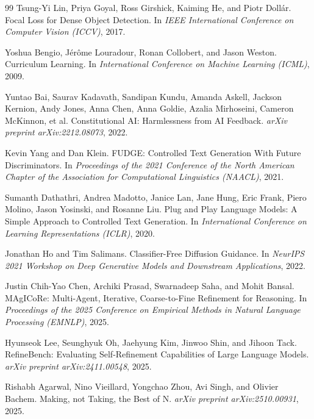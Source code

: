 \documentclass[11pt]{article}
\begin{document}
\begin{thebibliography}{99}
Tsung-Yi Lin, Priya Goyal, Ross Girshick, Kaiming He, and Piotr Doll\'{a}r.
\newblock Focal Loss for Dense Object Detection.
\newblock In \emph{IEEE International Conference on Computer Vision (ICCV)}, 2017.

Yoshua Bengio, J\'{e}r\^{o}me Louradour, Ronan Collobert, and Jason Weston.
\newblock Curriculum Learning.
\newblock In \emph{International Conference on Machine Learning (ICML)}, 2009.

Yuntao Bai, Saurav Kadavath, Sandipan Kundu, Amanda Askell, Jackson Kernion, Andy Jones, Anna Chen, Anna Goldie, Azalia Mirhoseini, Cameron McKinnon, et al.
\newblock Constitutional AI: Harmlessness from AI Feedback.
\newblock \emph{arXiv preprint arXiv:2212.08073}, 2022.

Kevin Yang and Dan Klein.
\newblock FUDGE: Controlled Text Generation With Future Discriminators.
\newblock In \emph{Proceedings of the 2021 Conference of the North American Chapter of the Association for Computational Linguistics (NAACL)}, 2021.

Sumanth Dathathri, Andrea Madotto, Janice Lan, Jane Hung, Eric Frank, Piero Molino, Jason Yosinski, and Rosanne Liu.
\newblock Plug and Play Language Models: A Simple Approach to Controlled Text Generation.
\newblock In \emph{International Conference on Learning Representations (ICLR)}, 2020.

Jonathan Ho and Tim Salimans.
\newblock Classifier-Free Diffusion Guidance.
\newblock In \emph{NeurIPS 2021 Workshop on Deep Generative Models and Downstream Applications}, 2022.

Justin Chih-Yao Chen, Archiki Prasad, Swarnadeep Saha, and Mohit Bansal.
\newblock MAgICoRe: Multi-Agent, Iterative, Coarse-to-Fine Refinement for Reasoning.
\newblock In \emph{Proceedings of the 2025 Conference on Empirical Methods in Natural Language Processing (EMNLP)}, 2025.

Hyunseok Lee, Seunghyuk Oh, Jaehyung Kim, Jinwoo Shin, and Jihoon Tack.
\newblock RefineBench: Evaluating Self-Refinement Capabilities of Large Language Models.
\newblock \emph{arXiv preprint arXiv:2411.00548}, 2025.

Rishabh Agarwal, Nino Vieillard, Yongchao Zhou, Avi Singh, and Olivier Bachem.
\newblock Making, not Taking, the Best of N.
\newblock \emph{arXiv preprint arXiv:2510.00931}, 2025.


\end{thebibliography}
\end{document}
